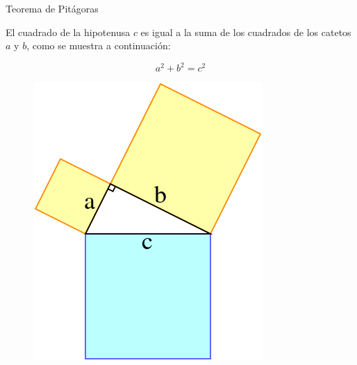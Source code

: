 \begin{infocard}{Teorema de Pitágoras}
    \begin{minipage}{0.55\textwidth}
    El cuadrado de la hipotenusa $c$ es igual a la suma de los cuadrados de los catetos $a$ y $b$, como se muestra a continuación:
    
   \[a^2+b^2=c^2\]
    \end{minipage}\hfill
    \begin{minipage}{0.45\textwidth}
    \begin{figure}[H]
        \centering
        \includegraphics[width=0.55\linewidth]{../images/pythagorean_right_angle}
    \end{figure}
    \end{minipage}






\end{infocard}%